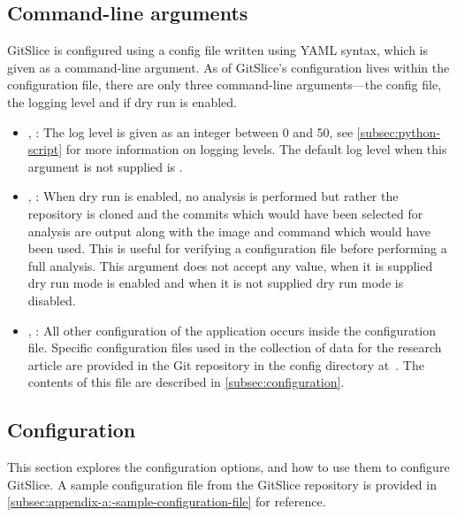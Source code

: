 \documentclass[11pt]{article}
\begin{document}
    \subsection{Command-line arguments}
    \label{subsec:command-line-arguments}

    GitSlice is configured using a config file written using YAML syntax, which is given as a command-line argument.
    As of GitSlice's configuration lives within the configuration file, there are only three command-line arguments---the config file, the logging level and if dry run is enabled.

    \begin{itemize}
        \item {}, : The log level is given as an integer between 0 and 50, see \autoref{subsec:python-script} for more information on logging levels.
              The default log level when this argument is not supplied is .
        \item {}, : When dry run is enabled, no analysis is performed but rather the repository is cloned and the commits which would have been selected for analysis are output along with the image and command which would have been used.
              This is useful for verifying a configuration file before performing a full analysis.
              This argument does not accept any value, when it is supplied dry run mode is enabled and when it is not supplied dry run mode is disabled.
        \item {}, : All other configuration of the application occurs inside the configuration file.
              Specific configuration files used in the collection of data for the research article are provided in the Git repository in the config directory at~\cite{config_files}.
              The contents of this file are described in \autoref{subsec:configuration}.
    \end{itemize}

    \subsection{Configuration}
    \label{subsec:configuration}

    This section explores the configuration options, and how to use them to configure GitSlice.
    A sample configuration file from the GitSlice repository is provided in \autoref{subsec:appendix-a:-sample-configuration-file} for reference.
\end{document}

